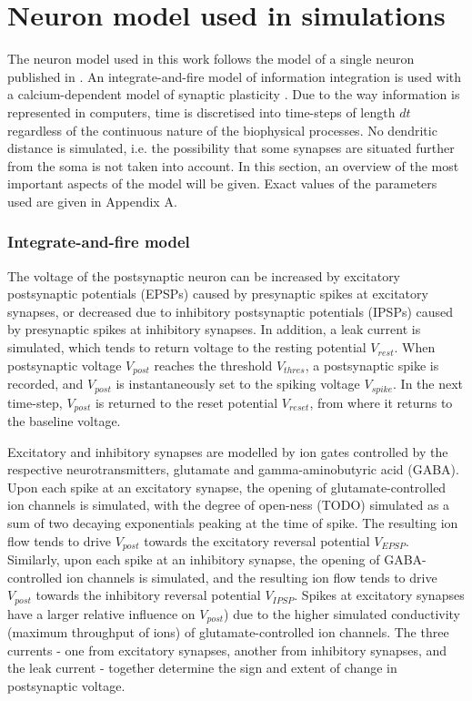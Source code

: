 \documentclass[a4paper,12pt]{report}
\theoremstyle{definition}
\begin{document}
\section{Neuron model used in simulations}

The neuron model used in this work follows the model of a single neuron published in \cite{yeung2004synaptic}. An integrate-and-fire model of information integration is used with a calcium-dependent model of synaptic plasticity \cite{shouval2002unified}. Due to the way information is represented in computers, time is discretised into time-steps of length $dt$ regardless of the continuous nature of the biophysical processes. No dendritic distance is simulated, i.e. the possibility that some synapses are situated further from the soma is not taken into account. In this section, an overview of the most important aspects of the model will be given. Exact values of the parameters used are given in Appendix A.


\subsubsection{Integrate-and-fire model}

The voltage of the postsynaptic neuron can be increased by excitatory postsynaptic potentials (EPSPs) caused by presynaptic spikes at excitatory synapses, or decreased due to inhibitory postsynaptic potentials (IPSPs) caused by presynaptic spikes at inhibitory synapses. In addition, a leak current is simulated, which tends to return voltage to the resting potential $V_{rest}$. When postsynaptic voltage $V_{post}$ reaches the threshold $V_{thres}$, a postsynaptic spike is recorded, and $V_{post}$ is instantaneously set to the spiking voltage $V_{spike}$. In the next time-step, $V_{post}$ is returned to the reset potential $V_{reset}$, from where it returns to the baseline voltage.

Excitatory and inhibitory synapses are modelled by ion gates controlled by the respective neurotransmitters, glutamate and gamma-aminobutyric acid (GABA). Upon each spike at an excitatory synapse, the opening of glutamate-controlled ion channels is simulated, with the degree of open-ness (TODO) simulated as a sum of two decaying exponentials peaking at the time of spike. The resulting ion flow tends to drive $V_{post}$ towards the excitatory reversal potential $V_{EPSP}$. Similarly, upon each spike at an inhibitory synapse, the opening of GABA-controlled ion channels is simulated, and the resulting ion flow tends to drive $V_{post}$ towards the inhibitory reversal potential $V_{IPSP}$. Spikes at excitatory synapses have a larger relative influence on $V_{post}$) due to the higher simulated conductivity (maximum throughput of ions) of glutamate-controlled ion channels. The three currents - one from excitatory synapses, another from inhibitory synapses, and the leak current - together determine the sign and extent of change in postsynaptic voltage.
\end{document}
